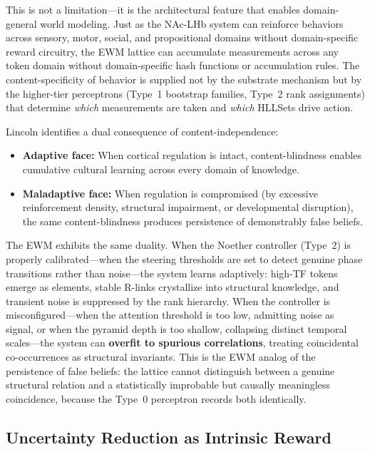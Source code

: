 \documentclass[11pt,a4paper]{article}
\theoremstyle{remark}
\begin{document}
This is not a limitation---it is the architectural feature that enables
domain-general world modeling. Just as the NAc-LHb system can reinforce
behaviors across sensory, motor, social, and propositional domains without
domain-specific reward circuitry, the EWM lattice can accumulate measurements
across any token domain without domain-specific hash functions or accumulation
rules. The content-specificity of behavior is supplied not by the substrate
mechanism but by the higher-tier perceptrons (Type~1 bootstrap families, Type~2
rank assignments) that determine \textit{which} measurements are taken and
\textit{which} HLLSets drive action.

Lincoln identifies a dual consequence of content-independence:
\begin{itemize}[leftmargin=*,nosep]
  \item \textbf{Adaptive face:} When cortical regulation is intact,
    content-blindness enables cumulative cultural learning across every domain
    of knowledge.
  \item \textbf{Maladaptive face:} When regulation is compromised (by
    excessive reinforcement density, structural impairment, or developmental
    disruption), the same content-blindness produces persistence of
    demonstrably false beliefs.
\end{itemize}

The EWM exhibits the same duality. When the Noether controller (Type~2) is
properly calibrated---when the steering thresholds are set to detect genuine
phase transitions rather than noise---the system learns adaptively: high-TF
tokens emerge as elements, stable R-links crystallize into structural knowledge,
and transient noise is suppressed by the rank hierarchy. When the controller is
misconfigured---when the attention threshold is too low, admitting noise as
signal, or when the pyramid depth is too shallow, collapsing distinct temporal
scales---the system can \textbf{overfit to spurious correlations}, treating
coincidental co-occurrences as structural invariants. This is the EWM analog of
the persistence of false beliefs: the lattice cannot distinguish between a
genuine structural relation and a statistically improbable but causally
meaningless coincidence, because the Type~0 perceptron records both identically.

\subsection{Uncertainty Reduction as Intrinsic Reward}
\label{sec:intrinsic-reward}
\end{document}
